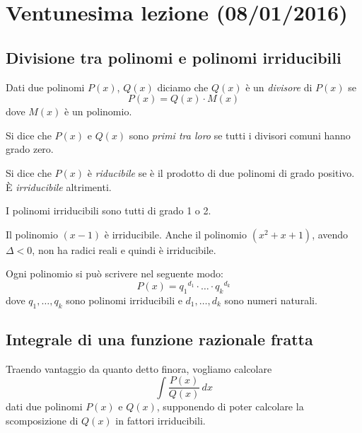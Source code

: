 \chapter{Ventunesima lezione (08/01/2016)}

\section{Divisione tra polinomi e polinomi irriducibili}

\begin{definition}
Dati due polinomi $P(x)$, $Q(x)$ diciamo che $Q(x)$ è un \emph{divisore} di $P(x)$ se
\begin{equation*}
P(x) = Q(x) \cdot M(x)
\end{equation*}
dove $M(x)$ è un polinomio.
\end{definition}

\begin{definition}
Si dice che $P(x)$ e $Q(x)$ sono \emph{primi tra loro} se tutti i divisori comuni hanno grado zero.
\end{definition}

\begin{definition}
Si dice che $P(x)$ è \emph{riducibile} se è il prodotto di due polinomi di grado positivo. È \emph{irriducibile} altrimenti.
\end{definition}

\begin{remark}
I polinomi irriducibili sono tutti di grado 1 o 2.
\end{remark}

\begin{example}
Il polinomio $(x-1)$ è irriducibile. Anche il polinomio $(x^2+x+1)$, avendo $\Delta < 0$, non ha radici reali e quindi è irriducibile.
\end{example}

Ogni polinomio si può scrivere nel seguente modo:
\begin{equation*}
P(x) = {q_1}^{d_1} \cdot \ldots \cdot {q_k}^{d_k}
\end{equation*}
dove $q_1, \ldots, q_k$ sono polinomi irriducibili e $d_1, \ldots, d_k$ sono numeri naturali.

\section{Integrale di una funzione razionale fratta}
Traendo vantaggio da quanto detto finora, vogliamo calcolare 
\begin{equation*}
\int \frac{P(x)}{Q(x)} \, dx
\end{equation*}
dati due polinomi $P(x)$ e $Q(x)$, supponendo di poter calcolare la scomposizione di $Q(x)$ in fattori irriducibili.

